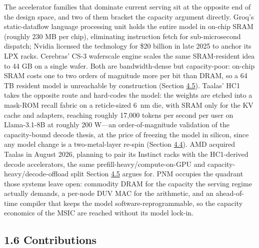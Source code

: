 \documentclass[12pt,onecolumn]{article}
\begin{document}
The accelerator families that dominate current serving sit at the opposite end of the design space, and two of them bracket the capacity argument directly. Groq's static-dataflow language processing unit holds the entire model in on-chip SRAM (roughly 230 MB per chip), eliminating instruction fetch for sub-microsecond dispatch; Nvidia licensed the technology for \$20 billion in late 2025 to anchor its LPX racks\cite{38}. Cerebras' CS-3 waferscale engine scales the same SRAM-resident idea to 44 GB on a single wafer\cite{39}. Both are bandwidth-dense but capacity-poor: on-chip SRAM costs one to two orders of magnitude more per bit than DRAM, so a 64 TB resident model is unreachable by construction (Section \hyperref[sec:4.5]{4.5}). Taalas' HC1 takes the opposite route and hard-codes the model: the weights are etched into a mask-ROM recall fabric on a reticle-sized 6~nm die, with SRAM only for the KV cache and adapters, reaching roughly 17,000 tokens per second per user on Llama-3.1-8B at roughly 200 W\cite{40}---an order-of-magnitude validation of the capacity-bound decode thesis, at the price of freezing the model in silicon, since any model change is a two-metal-layer re-spin (Section \hyperref[sec:4.4]{4.4}). AMD acquired Taalas in August 2026, planning to pair its Instinct racks with the HC1-derived decode accelerators\cite{41}, the same prefill-heavy/compute-on-GPU and capacity-heavy/decode-offload split Section \hyperref[sec:4.5]{4.5} argues for. PNM occupies the quadrant those systems leave open: commodity DRAM for the capacity the serving regime actually demands, a per-node DUV MAC for the arithmetic, and an ahead-of-time compiler that keeps the model software-reprogrammable, so the capacity economics of the MSIC are reached without its model lock-in.

\subsection*{1.6 Contributions}\label{sec:1.6}
\end{document}
